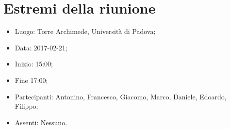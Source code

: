 \documentclass[../verbale-2017-02-21.tex]{subfiles}
\begin{document}
\section{Estremi della riunione}
	\begin{itemize}
		\item Luogo: Torre Archimede, Università di Padova;
        \item Data: 2017-02-21;
        \item Inizio: 15:00;
        \item Fine 17:00;
		\item Partecipanti: Antonino, Francesco, Giacomo, Marco, Daniele, Edoardo, Filippo;
        \item Assenti: Nessuno.
	\end{itemize}
\end{document}

